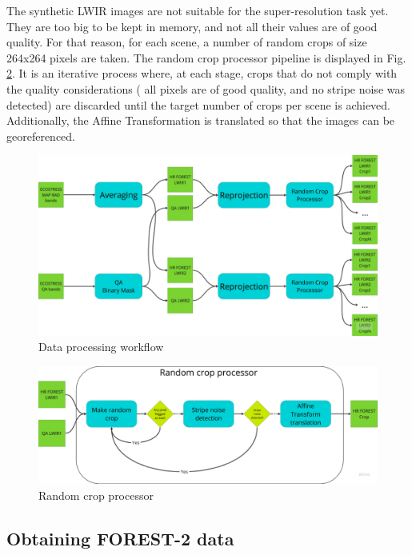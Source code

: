 The synthetic LWIR images are not suitable for the super-resolution task yet.
They are too big to be kept in memory, and not all their values are of good quality.
For that reason, for each scene, a number of random crops of size 264x264 pixels are taken.
The random crop processor pipeline is displayed in Fig. \ref{fig:5-random_crop_processor}.
It is an iterative process where, at each stage, crops that do not comply with the quality considerations ( all pixels are of good quality, and no stripe noise was detected) are discarded until the target number of crops per scene is achieved.
Additionally, the Affine Transformation is translated so that the images can be georeferenced.


\begin{figure}[H]
    \centering
    \includegraphics[width=\linewidth]{Includes/5-data_processing_flow_chart.pdf}
    \caption{Data processing workflow}
    \label{fig:5-data_processing_flow_chart}
\end{figure}

\begin{figure}[H]
    \centering
    \includegraphics[width=\linewidth]{Includes/5-random_crop_processor.pdf}
    \caption{Random crop processor}
    \label{fig:5-random_crop_processor}
\end{figure}



\subsection{Obtaining FOREST-2 data}

